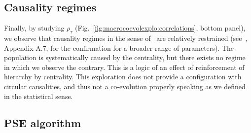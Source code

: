 \subsection{Causality regimes}


Finally, by studying $\rho_{\tau}$ (Fig.~\ref{fig:macrocoevolexplo:correlations}, bottom panel), we observe that causality regimes in the sense of~\cite{raimbault2017identification} are relatively restrained (see~\cite{raimbault:tel-01857741}, Appendix A.7, for the confirmation for a broader range of parameters). The population is systematically caused by the centrality, but there exists no regime in which we observe the contrary. This is a logic of an effect of reinforcement of hierarchy by centrality. This exploration does not provide a configuration with circular causalities, and thus not a co-evolution properly speaking as we defined in the statistical sense.











\subsection{PSE algorithm}


